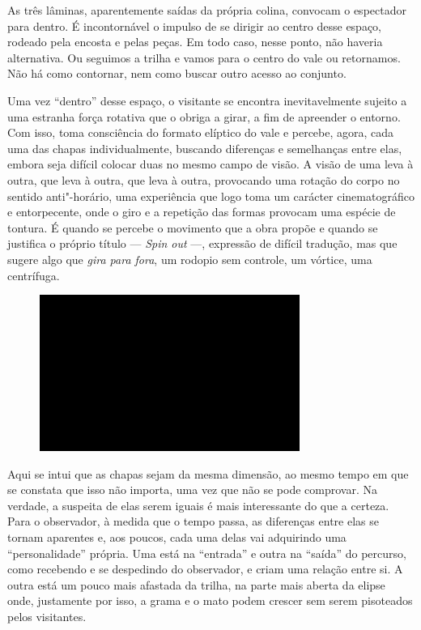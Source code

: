 As três lâminas, aparentemente saídas da própria colina, convocam o
espectador para dentro. É incontornável o impulso de se dirigir ao
centro desse espaço, rodeado pela encosta e pelas peças. Em todo caso,
nesse ponto, não haveria alternativa. Ou seguimos a trilha e vamos para
o centro do vale ou retornamos. Não há como contornar, nem como buscar
outro acesso ao conjunto.

Uma vez ``dentro'' desse espaço, o visitante se encontra inevitavelmente
sujeito a uma estranha força rotativa que o obriga a girar, a fim de
apreender o entorno. Com isso, toma consciência do formato elíptico do
vale e percebe, agora, cada uma das chapas individualmente, buscando
diferenças e semelhanças entre elas, embora seja difícil colocar duas no
mesmo campo de visão. A visão de uma leva à outra, que leva à outra, que
leva à outra, provocando uma rotação do corpo no sentido anti"-horário,
uma experiência que logo toma um carácter cinematográfico e
entorpecente, onde o giro e a repetição das formas provocam uma espécie
de tontura. É quando se percebe o movimento que a obra propõe e quando
se justifica o próprio título --- \emph{Spin out} ---, expressão de
difícil tradução, mas que sugere algo que \emph{gira para fora}, um
rodopio sem controle, um vórtice, uma centrífuga.

\begin{figure}[!ht]

\centering
 \includegraphics[width=85mm]{./imgs/im1.jpg}
\caption{\tiny{}}

\end{figure}

Aqui se intui que as chapas sejam da mesma dimensão, ao mesmo tempo em
que se constata que isso não importa, uma vez que não se pode comprovar.
Na verdade, a suspeita de elas serem iguais é mais interessante do que a
certeza. Para o observador, à medida que o tempo passa, as diferenças
entre elas se tornam aparentes e, aos poucos, cada uma delas vai
adquirindo uma ``personalidade'' própria. Uma está na ``entrada'' e
outra na ``saída'' do percurso, como recebendo e se despedindo do
observador, e criam uma relação entre si. A outra está um pouco mais
afastada da trilha, na parte mais aberta da elipse onde, justamente por
isso, a grama e o mato podem crescer sem serem pisoteados pelos
visitantes.

